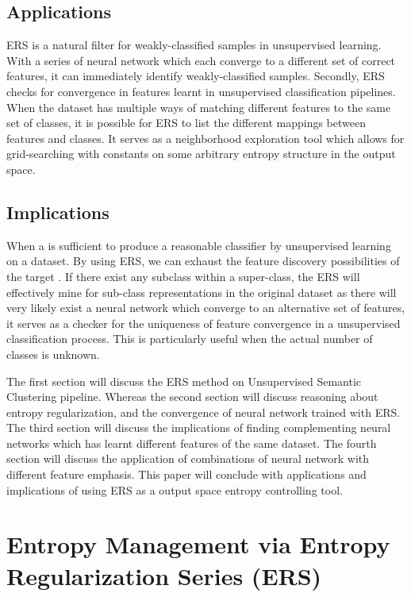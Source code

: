 \documentclass[10pt,twocolumn,letterpaper]{article}
\begin{document}
\subsection{Applications} ERS is a natural filter for weakly-classified samples in unsupervised learning. With a series of neural network which each converge to a different set of correct features, it can immediately identify weakly-classified samples. Secondly, ERS checks for convergence in features learnt in unsupervised classification pipelines. When the dataset has multiple ways of matching different features to the same set of classes, it is possible for ERS to list the different mappings between features and classes. It serves as a neighborhood exploration tool which allows for grid-searching with constants on some arbitrary entropy structure in the output space. 

\subsection{Implications} When a   is sufficient to produce a reasonable classifier by unsupervised learning on a dataset. By using ERS, we can exhaust the feature discovery possibilities of the target . If there exist any subclass within a super-class, the ERS will effectively mine for sub-class representations in the original dataset as there will very likely exist a neural network which converge to an alternative set of features, it serves as a checker for the uniqueness of feature convergence in a unsupervised classification process. This is particularly useful when the actual number of classes is unknown. 


The first section will discuss the ERS method on Unsupervised Semantic Clustering pipeline. Whereas the second section will discuss reasoning about entropy regularization, and the convergence of neural network trained with ERS. The third section will discuss the implications of finding complementing neural networks which has learnt different features of the same dataset. The fourth section will discuss the application of combinations of neural network with different feature emphasis. This paper will conclude with applications and implications of using ERS as a output space entropy controlling tool. 

\section{Entropy Management via Entropy Regularization Series (ERS) }
\end{document}
